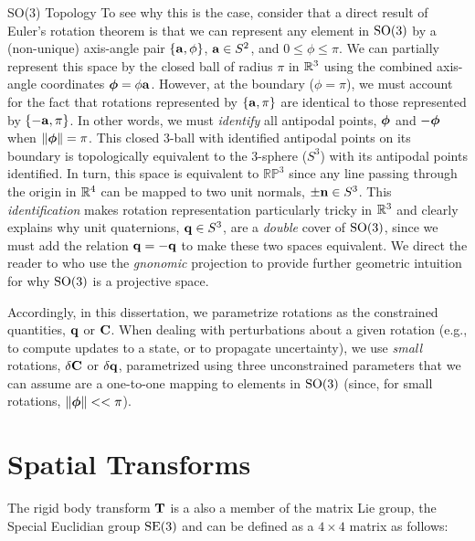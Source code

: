 \begin{remark}{SO(3) Topology}
To see why this is the case, consider that a direct result of Euler's rotation theorem is that we can represent any element in $\mathrm{SO}(3)$ by a (non-unique) axis-angle pair $\{\boldsymbol{\mathbf{a}}, \phi\}$, $\boldsymbol{\mathbf{a}} \in S^2$, and $0 \leq \phi \leq \pi$. We can partially represent this space by the closed ball of radius $\pi$ in $\RealNumbers{}^3$ using the combined axis-angle coordinates $\boldsymbol{\mathbf{\phi}} = \phi \boldsymbol{\mathbf{a}}$. However, at the boundary ($\phi = \pi$), we must account for the fact that rotations represented by $\{\boldsymbol{\mathbf{a}}, \pi\}$ are identical to those represented by $\{-\boldsymbol{\mathbf{a}}, \pi\}$. In other words, we must \textit{identify} all antipodal points, $\boldsymbol{\mathbf{\phi}}$ and $-\boldsymbol{\mathbf{\phi}}$ when $\left\Vert\boldsymbol{\mathbf{\phi}}\right\Vert = \pi$. This closed 3-ball with identified antipodal points on its boundary is topologically equivalent to the 3-sphere ($S^3$) with its antipodal points identified. In turn, this space is equivalent to $\mathbb{RP}^3$ since any line passing through the origin in $\RealNumbers^4$ can be mapped to two unit normals, $\pm \boldsymbol{\mathbf{n}} \in S^3$.
This \textit{identification} makes rotation representation particularly tricky in $\RealNumbers{}^3$ and clearly explains why unit quaternions, $\boldsymbol{\mathbf{q}} \in S^3$, are a \textit{double} cover of  $\mathrm{SO}(3)$, since we must add the relation $\boldsymbol{\mathbf{q}} = -\boldsymbol{\mathbf{q}}$ to make these two spaces equivalent. We direct the reader to \cite{Hartley2013-rc} who use the \textit{gnonomic} projection to provide further geometric intuition for why $\mathrm{SO}(3)$ is a projective space. 
\end{remark}
Accordingly, in this dissertation, we parametrize rotations as the constrained quantities, $\boldsymbol{\mathbf{q}}$ or $\boldsymbol{\mathbf{C}}$. When dealing with perturbations about a given rotation (e.g., to compute updates to a state, or to propagate uncertainty), we use \textit{small} rotations, $\delta \boldsymbol{\mathbf{C}}$ or $\delta \boldsymbol{\mathbf{q}}$, parametrized using three unconstrained parameters that we can assume are a one-to-one mapping to elements in $\mathrm{SO}(3)$  (since, for small rotations, $\left\Vert\boldsymbol{\mathbf{\phi}}\right\Vert << \pi$).

\section{Spatial Transforms}
The rigid body transform $\boldsymbol{\mathbf{T}}$ is a also a member of the matrix Lie group, the Special Euclidian group $\mathrm{SE}(3)$ and can be defined as a $4 \times 4$ matrix as follows:

